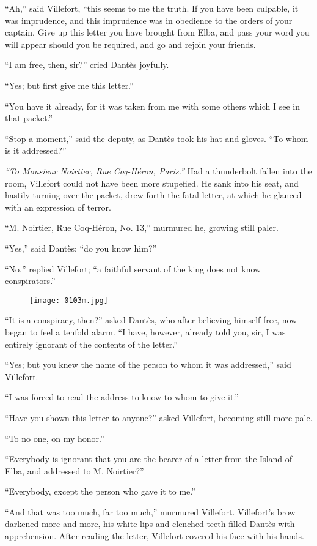 “Ah,” said Villefort, “this seems to me the truth. If you have been
culpable, it was imprudence, and this imprudence was in obedience to
the orders of your captain. Give up this letter you have brought from
Elba, and pass your word you will appear should you be required, and go
and rejoin your friends.

“I am free, then, sir?” cried Dantès joyfully.

“Yes; but first give me this letter.”

“You have it already, for it was taken from me with some others which I
see in that packet.”

“Stop a moment,” said the deputy, as Dantès took his hat and gloves.
“To whom is it addressed?”

\textit{“To Monsieur Noirtier, Rue Coq-Héron, Paris.”} Had a thunderbolt
fallen into the room, Villefort could not have been more stupefied. He
sank into his seat, and hastily turning over the packet, drew forth the
fatal letter, at which he glanced with an expression of terror.

“M. Noirtier, Rue Coq-Héron, No. 13,” murmured he, growing still paler.

“Yes,” said Dantès; “do you know him?”

“No,” replied Villefort; “a faithful servant of the king does not know
conspirators.”

\begin{figure}[h]
\texttt{[image: 0103m.jpg]}
\end{figure}

“It is a conspiracy, then?” asked Dantès, who after believing himself
free, now began to feel a tenfold alarm. “I have, however, already told
you, sir, I was entirely ignorant of the contents of the letter.”

“Yes; but you knew the name of the person to whom it was addressed,”
said Villefort.

“I was forced to read the address to know to whom to give it.”

“Have you shown this letter to anyone?” asked Villefort, becoming still
more pale.

“To no one, on my honor.”

“Everybody is ignorant that you are the bearer of a letter from the
Island of Elba, and addressed to M. Noirtier?”

“Everybody, except the person who gave it to me.”

“And that was too much, far too much,” murmured Villefort. Villefort’s
brow darkened more and more, his white lips and clenched teeth filled
Dantès with apprehension. After reading the letter, Villefort covered
his face with his hands.

